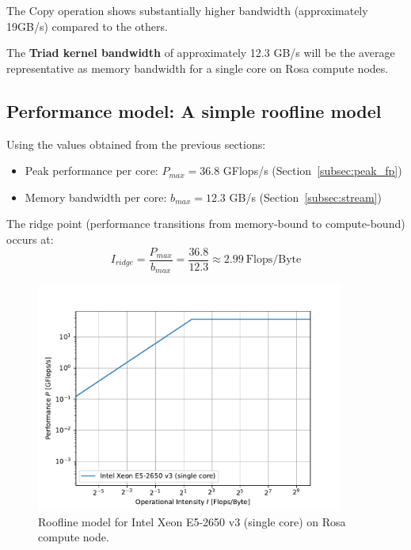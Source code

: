 The Copy operation shows substantially higher bandwidth (approximately 19GB/s) compared to the others.

The \textbf{Triad kernel bandwidth} of approximately 12.3 GB/s will be the average representative as memory bandwidth for a single core on Rosa compute nodes.

\subsection{Performance model: A simple roofline model}
\label{subsec:roofline}

Using the values obtained from the previous sections:
\begin{itemize}
    \item Peak performance per core: $P_{max} = 36.8$ GFlops/s (Section~\ref{subsec:peak_fp})
    \item Memory bandwidth per core: $b_{max} = 12.3$ GB/s (Section~\ref{subsec:stream})
\end{itemize}

The ridge point (performance transitions from memory-bound to compute-bound) occurs at:
\[
I_{ridge} = \frac{P_{max}}{b_{max}} = \frac{36.8}{12.3} \approx 2.99~\mathrm{Flops/Byte}
\]

\begin{figure}[h]
    \centering
    \includegraphics[width=0.9\textwidth]{../src/2-Performance-characteristics/04/roofline.pdf}
    \caption{Roofline model for Intel Xeon E5-2650 v3 (single core) on Rosa compute node.}
    \label{fig:roofline}
\end{figure}

